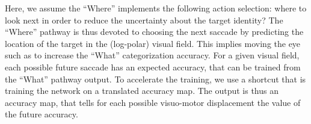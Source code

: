 %
%
%
Here, we assume the ``Where'' implements the following action selection: where to look next in order to reduce the uncertainty about the target identity?
The ``Where'' pathway is thus devoted to choosing the next saccade by predicting the location of the target in the (log-polar) visual field.
This implies moving the eye such as to increase the ``What'' categorization accuracy. For a given visual field, each possible future saccade has an expected accuracy, that can be trained from the ``What'' pathway output. To accelerate the training, we use a shortcut that is training the network on a translated accuracy map. The output is thus an accuracy map, that tells for each possible visuo-motor displacement the value of the future accuracy.

